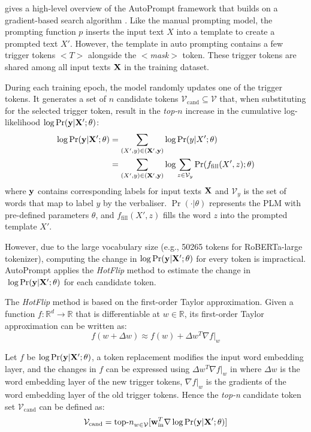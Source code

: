  gives a high-level overview of the AutoPrompt framework that builds on a gradient-based search algorithm \cite{wallace19Gradientsearch}. Like the manual prompting model, the prompting function $p$ inserts the input text $X$ into a template to create a prompted text $X'$. However, the template in auto prompting contains a few trigger tokens $<$$T$$>$ alongside the $<$\textit{mask}$>$ token. These trigger tokens are shared among all input texts $\bold{X}$ in the training dataset.

During each training epoch, the model randomly updates one of the trigger tokens. It  generates a set of $n$ candidate tokens $\mathcal{V}_{\text{cand}} \subseteq \mathcal{V}$ that, when substituting for the selected trigger token, result in the \emph{top-$n$} increase in the cumulative log-likelihood $\log \Pr(\bold{y} | \bold{X}'; \theta)$:
\begin{equation}
\begin{split}
    \log \Pr(\bold{y} | \bold{X}'; \theta) & = \sum_{(X', y) \in (\bold{X}', \bold{y})} \log \Pr(y|X'; \theta) \\
    & = \sum_{(X', y) \in (\bold{X}', \bold{y})} \log \sum_{z \in \mathcal{V}_y} \Pr(f_{\text{fill}}(X', z); \theta)
\end{split}
\end{equation}
where $\bold{y}$ contains corresponding labels for input texts $\bold{X}$ and $\mathcal{V}_y$ is the set of words that map to label $y$ by the verbaliser. $\Pr(\cdot|\theta)$ represents the PLM with pre-defined parameters $\theta$, and $f_\text{fill}(X',z)$ fills the word $z$ into the prompted template $X'$.

However, due to the large vocabulary size (e.g., 50265 tokens for RoBERTa-large tokenizer), computing the change in $\log \Pr(\bold{y} | \bold{X}'; \theta)$ for every token is impractical. AutoPrompt applies the \emph{HotFlip} \cite{Ebrahimi17HotFlip} method to estimate the change in $\ \log \Pr(\bold{y} | \bold{X}'; \theta)$ for each candidate token. 

The \emph{HotFlip} method is based on the first-order Taylor approximation. Given a function $f: \mathbb{R}^d \to \mathbb{R}$ that is differentiable at $w \in \mathbb{R}$, its first-order Taylor approximation can be written as:
\begin{equation}
\label{eq:taylorApprox}
    f(w + \Delta w) \approx f(w) + \Delta w^T \nabla f|_{w}
\end{equation}

Let $f$ be $\log \Pr(\bold{y} | \bold{X}'; \theta)$, a token replacement modifies the input word embedding layer, and the changes in $f$ can be expressed using $\Delta w^T\nabla f|_{w}$ in  where $\Delta w$ is the word embedding layer of the new trigger tokens, $\nabla f|_{w}$ is the gradients of the word embedding layer of the old trigger tokens. Hence the \emph{top-n} candidate token set $\mathcal{V}_\text{cand}$ can be defined as:
\begin{equation}
    \mathcal{V}_{\text{cand}} = {\text{top-}n}_{w\in \mathcal{V}} [\mathbf{w}_{\text{in}}^T \nabla \log \Pr(\bold{y} | \bold{X}'; \theta)]
\end{equation}

